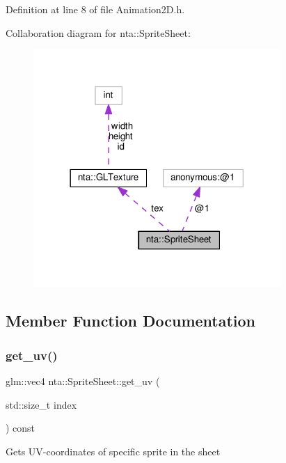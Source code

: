 Definition at line 8 of file Animation2\+D.\+h.



Collaboration diagram for nta\+:\+:Sprite\+Sheet\+:
\nopagebreak
\begin{figure}[H]
\begin{center}
\leavevmode
\includegraphics[width=266pt]{d2/d89/structnta_1_1SpriteSheet__coll__graph}
\end{center}
\end{figure}


\subsection{Member Function Documentation}
\mbox{\label{structnta_1_1SpriteSheet_a618bc48e6978a19ad9eb56dda3307f5a}} 
\subsubsection{\texorpdfstring{get\+\_\+uv()}{get\_uv()}}
{\footnotesize\ttfamily glm\+::vec4 nta\+::\+Sprite\+Sheet\+::get\+\_\+uv (\begin{DoxyParamCaption}\item[{std\+::size\+\_\+t}]{index }\end{DoxyParamCaption}) const\hspace{0.3cm}{\ttfamily [inline]}}

Gets U\+V-\/coordinates of specific sprite in the sheet

